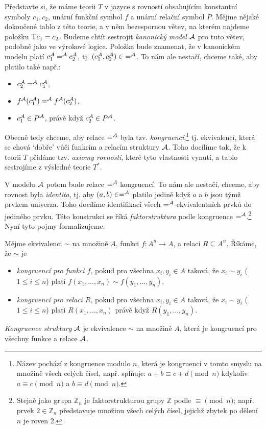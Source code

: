 Představte si, že máme teorii $T$ v jazyce s rovností obsahujícím konstantní symboly $c_1,c_2$, unární funkční symbol $f$ a unární relační symbol $P$. Mějme nějaké dokončené tablo z této teorie, a v něm bezespornou větev, na kterém najdeme položku $\mathrm{T} c_1=c_2$. Budeme chtít sestrojit \emph{kanonický model} $\mathcal{A}$ pro tuto větev, podobně jako ve výrokové logice. Položka bude znamenat, že v kanonickém modelu platí $c_1^{\mathcal{A}} =^{\mathcal{A}} c_2^{\mathcal{A}}$, tj. $(c_1^{\mathcal{A}},c_2^{\mathcal{A}})\in {=^{\mathcal{A}}}$. To nám ale nestačí, chceme také, aby platilo také např.:
\begin{itemize}
    \item $c_2^{\mathcal{A}} =^{\mathcal{A}} c_1^{\mathcal{A}}$,
    \item $f^{\mathcal{A}}(c_1^{\mathcal{A}}) =^{\mathcal{A}} f^{\mathcal{A}}(c_2^{\mathcal{A}})$,
    \item $c_1^{\mathcal{A}}\in P^{\mathcal{A}}$, právě když $c_2^{\mathcal{A}}\in P^{\mathcal{A}}$.
\end{itemize}
Obecně tedy chceme, aby relace $=^{\mathcal{A}}$ byla tzv. \emph{kongruencí},\footnote{Název pochází z kongruence modulo $n$, která je kongruencí v tomto smyslu na množině všech celých čísel, např. splňuje: $a+b\equiv c+d\pmod n$ kdykoliv $a\equiv c\pmod n$ a $b\equiv d\pmod n$.} tj. ekvivalencí, která se chová `dobře' vůči funkcím a relacím struktury $\mathcal{A}$. Toho docílíme tak, že k teorii $T$ přidáme tzv. \emph{axiomy rovnosti}, které tyto vlastnosti vynutí, a tablo sestrojíme z výsledné teorie $T^*$.

V modelu $\mathcal{A}$ potom bude relace $=^{\mathcal{A}}$ kongruencí. To nám ale nestačí, chceme, aby rovnost byla \emph{identita}, tj. aby $(a,b)\in=^{\mathcal{A}}$ platilo jedině když $a$ a $b$ jsou týmž prvkem univerza. Toho docílíme identifikací všech $=^{\mathcal{A}}$-ekvivalentních prvků do jediného prvku. Této konstrukci se říká \emph{faktorstruktura} podle kongruence $=^{\mathcal{A}}$.\footnote{Stejně jako grupa $\mathbb Z_n$ je faktorstrukturou grupy $\mathbb Z$ podle $\equiv\pmod n$; např. prvek $2\in\mathbb Z_n$ představuje množinu všech celých čísel, jejichž zbytek po dělení $n$ je roven 2.} Nyní tyto pojmy formalizujeme.

\begin{definition}[Kongruence]
    Mějme ekvivalenci $\sim$ na množině $A$, funkci $f\colon A^n\to A$, a relaci $R\subseteq A^n$. Říkáme, že $\sim$ je
    \begin{itemize}
        \item \emph{kongruencí pro funkci $f$}, pokud pro všechna $x_i,y_i\in A$ taková, že $x_i\sim y_i$ ($1\leq i\leq n$) platí $f(x_1,\dots,x_n)\sim f(y_1,\dots,y_n)$,
        \item \emph{kongruencí pro relaci $R$}, pokud pro všechna $x_i,y_i\in A$ taková, že $x_i\sim y_i$ ($1\leq i\leq n$) platí $R(x_1,\dots,x_n)$ právě když $R(y_1,\dots,y_n)$.
    \end{itemize}    
    \emph{Kongruence struktury} $\mathcal{A}$ je ekvivalence $\sim$ na množině $A$, která je kongruencí pro všechny funkce a relace $\mathcal{A}$. 
\end{definition}

